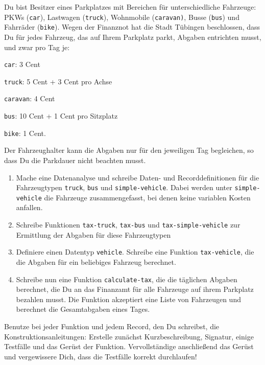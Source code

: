 \begin{aufgabe}
   Du bist Besitzer eines Parkplatzes mit
  Bereichen für unterschiedliche Fahrzeuge:  PKWs (\texttt{car}), Lastwagen
  (\texttt{truck}), Wohnmobile (\texttt{caravan)}, Busse (\texttt{bus})
  und Fahrräder (\texttt{bike}). 
  Wegen der Finanznot hat die Stadt Tübingen beschlossen, dass 
  Du für jedes Fahrzeug, das auf Ihrem Parkplatz
  parkt, Abgaben entrichten musst, und zwar pro Tag je:
  \begin{list}{-}{}
  \item \texttt{car}: 3 Cent
  \item \texttt{truck}: 5 Cent + 3 Cent pro Achse
  \item \texttt{caravan}: 4 Cent
  \item \texttt{bus}: 10 Cent + 1 Cent pro Sitzplatz
  \item \texttt{bike}: 1 Cent.
  \end{list} 
  Der Fahrzeughalter kann die Abgaben nur für den jeweiligen Tag begleichen, 
  so dass Du die Parkdauer nicht beachten musst.

  \begin{enumerate}
  \item Mache eine Datenanalyse und schreibe Daten- und 
    Recorddefinitionen für die Fahrzeugtypen \texttt{truck}, \texttt{bus} und
    \texttt{simple-vehicle}. Dabei werden unter \texttt{simple-vehicle} die
    Fahrzeuge zusammengefasst, bei denen keine variablen Kosten anfallen.
  \item Schreibe  Funktionen
    \texttt{tax-truck}, \texttt{tax-bus} und \texttt{tax-simple-vehicle}
    zur Ermittlung der Abgaben für diese Fahrzeugtypen
  \item Definiere einen Datentyp \texttt{vehicle}. Schreibe eine
    Funktion \texttt{tax-vehicle}, die die Abgaben für ein beliebiges Fahrzeug 
    berechnet.    
  \item Schreibe nun eine Funktion \texttt{calculate-tax}, die die täglichen 
    Abgaben berechnet, die Du an das Finanzamt für alle Fahrzeuge auf ihrem Parkplatz
    bezahlen musst. Die Funktion akzeptiert eine Liste von Fahrzeugen und
    berechnet die Gesamtabgaben eines Tages.
  \end{enumerate}
  Benutze bei jeder Funktion und jedem Record, den Du schreibst,
  die Konstruktionsanleitungen: Erstelle zunächst
  Kurzbeschreibung, Signatur, einige Testfälle und das Gerüst der Funktion.
  Vervollständige anschließend das Gerüst und vergewissere Dich,
  dass die Testfälle korrekt durchlaufen!
\end{aufgabe}

